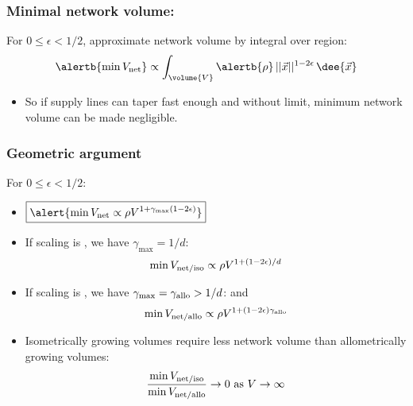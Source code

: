 \begin{frame}
  \frametitle{Minimal network volume:}

  For $0 \le \epsilon < 1/2$, approximate network volume by integral over region:
  $$ 
  \alertb{\min V_{\textnormal{net}}}  \propto 
  \int_{\volume{V}} \alertb{\rho} \, ||\vec{x}||^{1-2\epsilon} \, \dee{\vec{x}} 
  $$
  \begin{itemize}
  \item<4->
    So if supply lines can taper fast enough and without
    limit, minimum network volume can be made negligible.
  \end{itemize}
\end{frame}

\begin{frame}
  \frametitle{Geometric argument}

  \begin{block}{For $0 \le \epsilon < 1/2$:}
    \begin{itemize}
    \item<1-> 
      $
      \boxed{\alert{
          \min V_{\textnormal{net}} 
          \propto
          \rho V^{1+\gamma_{\max}(1-2\epsilon)} 
        }}
      $
    \item<2-> 
      If scaling is , we have $\gamma_{\max} = 1/d$:
      $$
      \min V_{\textnormal{net/iso}} 
      \propto
      \rho V^{1+(1-2\epsilon)/d}
      $$
    \item<3-> 
      If scaling is , we have
      $\gamma_{\max} = \gamma_{\textnormal{allo}} > 1/d$:
      and 
      $$
      \min V_{\textnormal{net/allo}} 
      \propto
      \rho V^{1+(1-2\epsilon)\gamma_{\textnormal{allo}}}
      $$
    \item<4-> 
      Isometrically growing volumes 
      \alert{require less network volume} 
      than allometrically growing volumes:
      $$
      \frac{\min V_{\textnormal{net/iso}}}{\min V_{\textnormal{net/allo}}} \rightarrow 0 
      \mbox{\ as $V \rightarrow \infty$}
      $$
    \end{itemize}    
    
  \end{block}
\end{frame}

